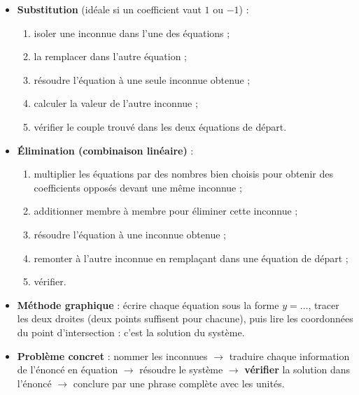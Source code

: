 \documentclass[11pt]{article}
\begin{document}
\begin{methode}
\begin{itemize}
  \item \textbf{Substitution} (idéale si un coefficient vaut $1$ ou $-1$) :
  \begin{enumerate}
    \item isoler une inconnue dans l'une des équations ;
    \item la remplacer dans l'autre équation ;
    \item résoudre l'équation à une seule inconnue obtenue ;
    \item calculer la valeur de l'autre inconnue ;
    \item vérifier le couple trouvé dans les deux équations de départ.
  \end{enumerate}
  \item \textbf{Élimination (combinaison linéaire)} :
  \begin{enumerate}
    \item multiplier les équations par des nombres bien choisis pour obtenir des coefficients opposés devant une même inconnue ;
    \item additionner membre à membre pour éliminer cette inconnue ;
    \item résoudre l'équation à une inconnue obtenue ;
    \item remonter à l'autre inconnue en remplaçant dans une équation de départ ;
    \item vérifier.
  \end{enumerate}
  \item \textbf{Méthode graphique} : écrire chaque équation sous la forme $y=\ldots$, tracer les deux droites (deux points suffisent pour chacune), puis lire les coordonnées du point d'intersection : c'est la solution du système.
  \item \textbf{Problème concret} : nommer les inconnues $\to$ traduire chaque information de l'énoncé en équation $\to$ résoudre le système $\to$ \textbf{vérifier} la solution dans l'énoncé $\to$ conclure par une phrase complète avec les unités.
\end{itemize}
\end{methode}
\end{document}
